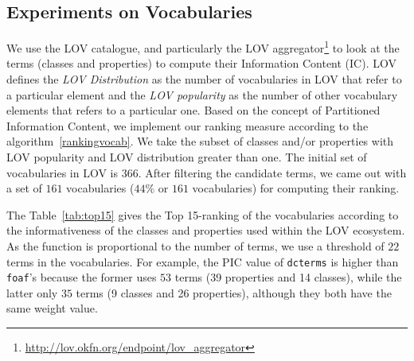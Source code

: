 \subsection{Experiments on Vocabularies}
\label{sec:experiments}
We use the LOV catalogue, and particularly the LOV aggregator\footnote{\url{http://lov.okfn.org/endpoint/lov_aggregator}} to look at the terms (classes and properties) to compute their Information Content (IC). LOV defines the \textit{LOV Distribution} as the number of vocabularies in LOV that refer to a particular element and the \textit{LOV popularity} as the number of other vocabulary elements that refers to a particular one. Based on the concept of Partitioned Information Content, we implement our ranking measure according to the algorithm~\ref{rankingvocab}. We take the subset of classes and/or properties with LOV popularity and LOV distribution greater than one. The initial set of vocabularies in LOV is $366$. After filtering the candidate terms, we came out with a set of $161$ vocabularies ($44\%$ or $161$ vocabularies) for computing their ranking.

The Table~\ref{tab:top15} gives the Top 15-ranking of the vocabularies according to the informativeness of the classes and properties used within the LOV ecosystem. As the function is proportional to the number of terms, we use a threshold of $22$ terms in the vocabularies. For example, the PIC value of \texttt{dcterms} is higher than \texttt{foaf}'s because the former uses $53$ terms (39 properties and 14 classes), while the latter only $35$ terms (9 classes and 26 properties), although they both have the same weight value.

